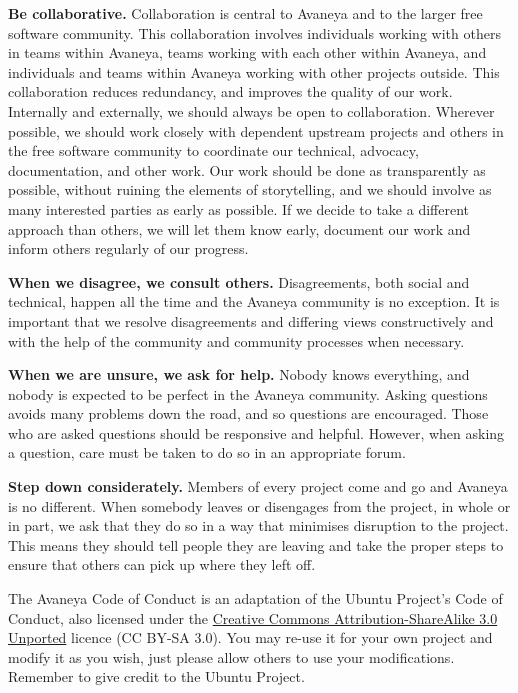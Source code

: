 \item
{\bf Be collaborative.} Collaboration is central to Avaneya and to the larger free software community. This collaboration involves individuals working with others in teams within Avaneya, teams working with each other within Avaneya, and individuals and teams within Avaneya working with other projects outside. This collaboration reduces redundancy, and improves the quality of our work. Internally and externally, we should always be open to collaboration. Wherever possible, we should work closely with dependent upstream projects and others in the free software community to coordinate our technical, advocacy, documentation, and other work. Our work should be done as transparently as possible, without ruining the elements of storytelling, and we should involve as many interested parties as early as possible. If we decide to take a different approach than others, we will let them know early, document our work and inform others regularly of our progress.

\item
{\bf When we disagree, we consult others.} Disagreements, both social and technical, happen all the time and the Avaneya community is no exception. It is important that we resolve disagreements and differing views constructively and with the help of the community and community processes when necessary.

\item
{\bf When we are unsure, we ask for help.} Nobody knows everything, and nobody is expected to be perfect in the Avaneya community. Asking questions avoids many problems down the road, and so questions are encouraged. Those who are asked questions should be responsive and helpful. However, when asking a question, care must be taken to do so in an appropriate forum.

\item
{\bf Step down considerately.} Members of every project come and go and Avaneya is no different. When somebody leaves or disengages from the project, in whole or in part, we ask that they do so in a way that minimises disruption to the project. This means they should tell people they are leaving and take the proper steps to ensure that others can pick up where they left off.
\stopitemize

The Avaneya Code of Conduct is an adaptation of the Ubuntu Project's Code of Conduct, also licensed under the \href{http://creativecommons.org/licenses/by-sa/3.0/}{Creative Commons Attribution-ShareAlike 3.0 Unported} licence (CC BY-SA 3.0). You may re-use it for your own project and modify it as you wish, just please allow others to use your modifications. Remember to give credit to the Ubuntu Project.

